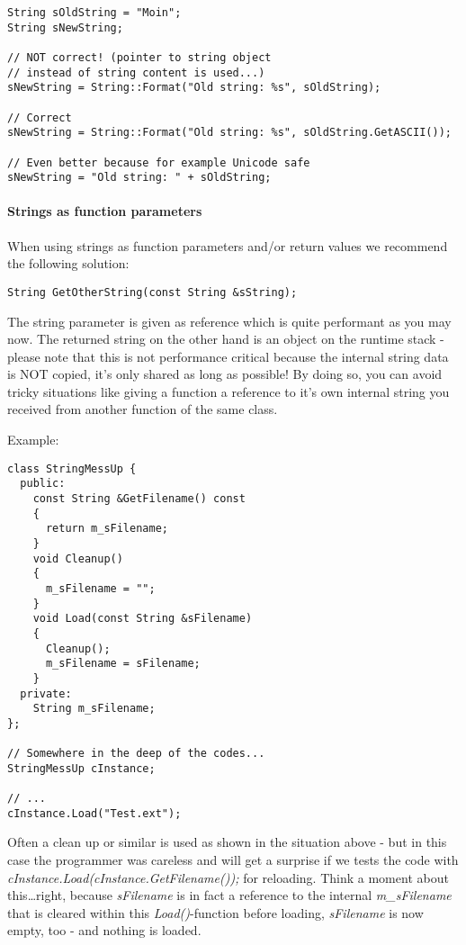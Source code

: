 \begin{lstlisting}[caption=Valid and invalid string usage example]
String sOldString = "Moin";
String sNewString;

// NOT correct! (pointer to string object
// instead of string content is used...)
sNewString = String::Format("Old string: %s", sOldString);

// Correct
sNewString = String::Format("Old string: %s", sOldString.GetASCII());

// Even better because for example Unicode safe
sNewString = "Old string: " + sOldString;
\end{lstlisting}


\paragraph{Strings as function parameters}
When using strings as function parameters and/or return values we recommend the following solution:

\begin{lstlisting}[caption=String as function parameter and return value]
String GetOtherString(const String &sString);
\end{lstlisting}

The string parameter is given as reference which is quite performant as you may now. The returned string on the other hand is an object on the runtime stack - please note that this is not performance critical because the internal string data is NOT copied, it's only shared as long as possible! By doing so, you can avoid tricky situations like giving a function a reference to it's own internal string you received from another function of the same class.

Example:

\begin{lstlisting}[caption=Error prone string usage example]
class StringMessUp {
  public:
    const String &GetFilename() const
    {
      return m_sFilename;
    }
    void Cleanup()
    {
      m_sFilename = "";
    }
    void Load(const String &sFilename)
    {
      Cleanup();
      m_sFilename = sFilename;
    }
  private:
    String m_sFilename;
};

// Somewhere in the deep of the codes...
StringMessUp cInstance;

// ...
cInstance.Load("Test.ext");
\end{lstlisting}

Often a clean up or similar is used as shown in the situation above - but in this case the programmer was careless and will get a surprise if we tests the code with \emph{cInstance.Load(cInstance.GetFilename());} for reloading. Think a moment about this\ldots right, because \emph{sFilename} is in fact a reference to the internal \emph{m\_sFilename} that is cleared within this \emph{Load()}-function before loading, \emph{sFilename} is now empty, too - and nothing is loaded.




